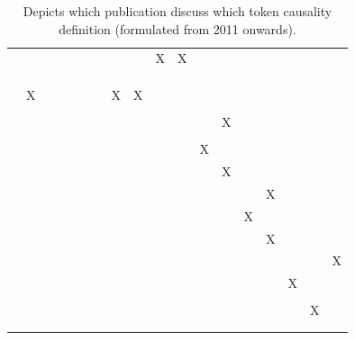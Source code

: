 \documentclass[11pt,a4paper]{book}
\theoremstyle{definition}
\theoremstyle{definition}
\theoremstyle{definition}
\theoremstyle{remark}
\begin{document}
\begin{table}
\begin{tabular}{lp{0.5cm}p{0.5cm}p{0.5cm}p{0.5cm}p{0.5cm}p{0.5cm}p{0.5cm}p{0.5cm}p{0.5cm}p{0.5cm}p{0.5cm}p{0.5cm}p{0.5cm}p{0.5cm}p{0.5cm}p{0.5cm}p{0.5cm}}
 \cite{blanchard2017cause}  	& 	& 	& 	& 	& 	& 	& 	& 	& X	& X	& 	& 	& 	& 	& 	& 	& 	\\
 \cite{wright2017ness}  	& 	& 	& 	& 	& 	& 	& 	& 	& 	& 	& 	& 	& 	& 	& 	& 	& 	\\
 \cite{icard2017normality} 	& 	& 	& 	& 	& 	& 	& 	& 	& 	& 	& 	& 	& 	& 	& 	& 	& 	\\
 \cite{aleksandrowicz2017computational}  	& 	& 	& 	& 	& 	& 	& 	& 	& 	& 	& 	& 	& 	& 	& 	& 	& 	\\
 \cite{fenton2017proposed}  	& X	& 	& 	& 	& 	& 	& X	& X	& 	& 	& 	& 	& 	& 	& 	& 	& 	\\
 \cite{lagnado2017causation}  	& 	& 	& 	& 	& 	& 	& 	& 	& 	& 	& 	& 	& 	& 	& 	& 	& 	\\
 \cite{bochman2018actual}  	& 	& 	& 	& 	& 	& 	& 	& 	& 	& 	& 	& X	& 	& 	& 	& 	& 	\\
 \cite{ibeling2018conditional}  	& 	& 	& 	& 	& 	& 	& 	& 	& 	& 	& 	& 	& 	& 	& 	& 	& 	\\
 \cite{beckers2018principled} 	& 	& 	& 	& 	& 	& 	& 	& 	& 	& 	& X	& 	& 	& 	& 	& 	& 	\\
 \cite{bochman2018laws}  	& 	& 	& 	& 	& 	& 	& 	& 	& 	& 	& 	& X	& 	& 	& 	& 	& 	\\
 \cite{denecker2018causal}  	& 	& 	& 	& 	& 	& 	& 	& 	& 	& 	& 	& 	& 	& X	& 	& 	& 	\\
 \cite{batusov2018situation}  	& 	& 	& 	& 	& 	& 	& 	& 	& 	& 	& 	& 	& X	& 	& 	& 	& 	\\
 \cite{denecker2019explaining}  	& 	& 	& 	& 	& 	& 	& 	& 	& 	& 	& 	& 	& 	& X	& 	& 	& 	\\
 \cite{liepicna2019evaluation}  	& 	& 	& 	& 	& 	& 	& 	& 	& 	& 	& 	& 	& 	& 	& 	& 	& X	\\
 \cite{leblanc2019explaining} 	& 	& 	& 	& 	& 	& 	& 	& 	& 	& 	& 	& 	& 	& 	& X	& 	& 	\\
 \cite{liepicna2020arguing} 	& 	& 	& 	& 	& 	& 	& 	& 	& 	& 	& 	& 	& 	& 	& 	& 	& 	\\
 \cite{khannecessary}  	& 	& 	& 	& 	& 	& 	& 	& 	& 	& 	& 	& 	& 	& 	& 	& X	& 	\\
 \cite{ibeling2020probabilistic}  	& 	& 	& 	& 	& 	& 	& 	& 	& 	& 	& 	& 	& 	& 	& 	& 	& 	\\
 \hline 
\cite{halpern2016actual} 	& 	& 	& 	& 	& 	& 	& 	& 	& 	& 	& 	& 	& 	& 	& 	& 	& 	\\
\bottomrule
\end{tabular}
\caption{Depicts which publication discuss which token causality definition (formulated from 2011 onwards).  }
\label{tab:language}
\end{table}
\end{document}
